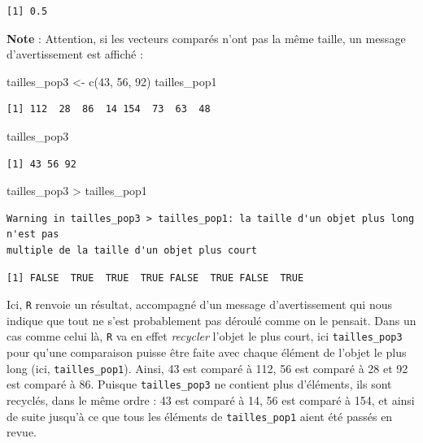 \documentclass[
  letterpaper,
  DIV=11,
  numbers=noendperiod]{scrreprt}
\newenvironment{Shaded}{\begin{snugshade}}{\end{snugshade}}
\newcommand{\DecValTok}[1]{\textcolor[rgb]{0.68,0.00,0.00}{#1}}
\newcommand{\FunctionTok}[1]{\textcolor[rgb]{0.28,0.35,0.67}{#1}}
\newcommand{\NormalTok}[1]{\textcolor[rgb]{0.00,0.23,0.31}{#1}}
\newcommand{\OtherTok}[1]{\textcolor[rgb]{0.00,0.23,0.31}{#1}}
\newcommand{\SpecialCharTok}[1]{\textcolor[rgb]{0.37,0.37,0.37}{#1}}
\begin{document}
\begin{verbatim}
[1] 0.5
\end{verbatim}

\textbf{Note} : Attention, si les vecteurs comparés n'ont pas la même
taille, un message d'avertissement est affiché :

\begin{Shaded}
\begin{Highlighting}[]
\NormalTok{tailles\_pop3 }\OtherTok{\textless{}{-}} \FunctionTok{c}\NormalTok{(}\DecValTok{43}\NormalTok{, }\DecValTok{56}\NormalTok{, }\DecValTok{92}\NormalTok{)}
\NormalTok{tailles\_pop1}
\end{Highlighting}
\end{Shaded}

\begin{verbatim}
[1] 112  28  86  14 154  73  63  48
\end{verbatim}

\begin{Shaded}
\begin{Highlighting}[]
\NormalTok{tailles\_pop3}
\end{Highlighting}
\end{Shaded}

\begin{verbatim}
[1] 43 56 92
\end{verbatim}

\begin{Shaded}
\begin{Highlighting}[]
\NormalTok{tailles\_pop3 }\SpecialCharTok{\textgreater{}}\NormalTok{ tailles\_pop1}
\end{Highlighting}
\end{Shaded}

\begin{verbatim}
Warning in tailles_pop3 > tailles_pop1: la taille d'un objet plus long n'est pas
multiple de la taille d'un objet plus court
\end{verbatim}

\begin{verbatim}
[1] FALSE  TRUE  TRUE  TRUE FALSE  TRUE FALSE  TRUE
\end{verbatim}

Ici, \texttt{R} renvoie un résultat, accompagné d'un message
d'avertissement qui nous indique que tout ne s'est probablement pas
déroulé comme on le pensait. Dans un cas comme celui là, \texttt{R} va
en effet \emph{recycler} l'objet le plus court, ici
\texttt{tailles\_pop3} pour qu'une comparaison puisse être faite avec
chaque élément de l'objet le plus long (ici, \texttt{tailles\_pop1}).
Ainsi, 43 est comparé à 112, 56 est comparé à 28 et 92 est comparé à 86.
Puisque \texttt{tailles\_pop3} ne contient plus d'éléments, ils sont
recyclés, dans le même ordre : 43 est comparé à 14, 56 est comparé à
154, et ainsi de suite jusqu'à ce que tous les éléments de
\texttt{tailles\_pop1} aient été passés en revue.
\end{document}
